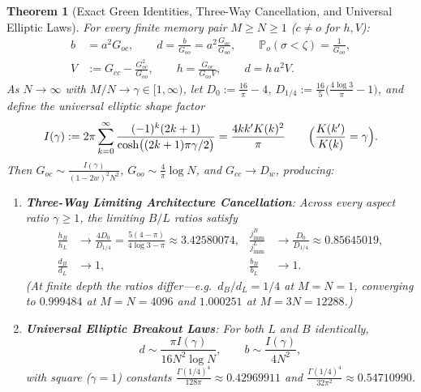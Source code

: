 \documentclass[11pt,reqno]{amsart}
\newtheorem{theorem}{Theorem}[section]
\theoremstyle{definition}
\theoremstyle{remark}
\newcommand{\Prob}{\mathbb{P}}
\begin{document}
\begin{theorem}[Exact Green Identities, Three-Way Cancellation, and Universal Elliptic Laws]\label{thm:fair-elliptic}
For every finite memory pair $M \ge N \ge 1$ ($c \neq o$ for $h, V$):
\begin{equation}\label{eq:green-identities}
\begin{aligned}
  b &= a^2 G_{oc}, \qquad
  d = \frac{b}{G_{oo}} = a^2 \frac{G_{oc}}{G_{oo}}, \qquad
  \Prob_o(\sigma < \zeta) = \frac{1}{G_{oo}}, \\
  V &:= G_{cc} - \frac{G_{oc}^2}{G_{oo}}, \qquad
  h = \frac{G_{oc}}{G_{oo} V}, \qquad
  d = h\, a^2 V.
\end{aligned}
\end{equation}
As $N \to \infty$ with $M/N \to \gamma \in [1,\infty)$, let $D_0 := \frac{16}{\pi} - 4$, $D_{1/4} := \frac{16}{5}\bigl(\frac{4\log 3}{\pi} - 1\bigr)$, and define the universal elliptic shape factor
\begin{equation}\label{eq:I-gamma}
  I(\gamma) := 2\pi \sum_{k=0}^\infty \frac{(-1)^k (2k+1)}{\cosh\bigl((2k+1)\pi\gamma/2\bigr)}
  = \frac{4 k k' K(k)^2}{\pi} \qquad \Bigl(\frac{K(k')}{K(k)} = \gamma\Bigr).
\end{equation}
Then $G_{oc} \sim \frac{I(\gamma)}{(1-2w)^2 N^2}$, $G_{oo} \sim \frac{4}{\pi}\log N$, and $G_{cc} \to D_w$, producing:
\begin{enumerate}
  \item \textbf{Three-Way Limiting Architecture Cancellation}: Across every aspect ratio $\gamma \ge 1$, the limiting $B/L$ ratios satisfy
  \begin{align*}
    \frac{h_B}{h_L} &\longrightarrow \frac{4 D_0}{D_{1/4}} = \frac{5(4-\pi)}{4\log 3 - \pi} \approx 3.42580074, &
    \frac{j_{\mathrm{imm}}^B}{j_{\mathrm{imm}}^L} &\longrightarrow \frac{D_0}{D_{1/4}} \approx 0.85645019, \\
    \frac{d_B}{d_L} &\longrightarrow 1, &
    \frac{b_B}{b_L} &\longrightarrow 1.
  \end{align*}
  (At finite depth the ratios differ---e.g.\ $d_B/d_L = 1/4$ at $M=N=1$, converging to $0.999484$ at $M=N=4096$ and $1.000251$ at $M=3N=12288$.)
  \item \textbf{Universal Elliptic Breakout Laws}: For \emph{both} $L$ and $B$ identically,
  \begin{equation}\label{eq:elliptic-laws}
    d \sim \frac{\pi I(\gamma)}{16 N^2 \log N}, \qquad
    b \sim \frac{I(\gamma)}{4 N^2},
  \end{equation}
  with square ($\gamma=1$) constants $\frac{\Gamma(1/4)^4}{128\pi} \approx 0.42969911$ and $\frac{\Gamma(1/4)^4}{32\pi^2} \approx 0.54710990$.

\end{enumerate}
\end{theorem}
\end{document}
